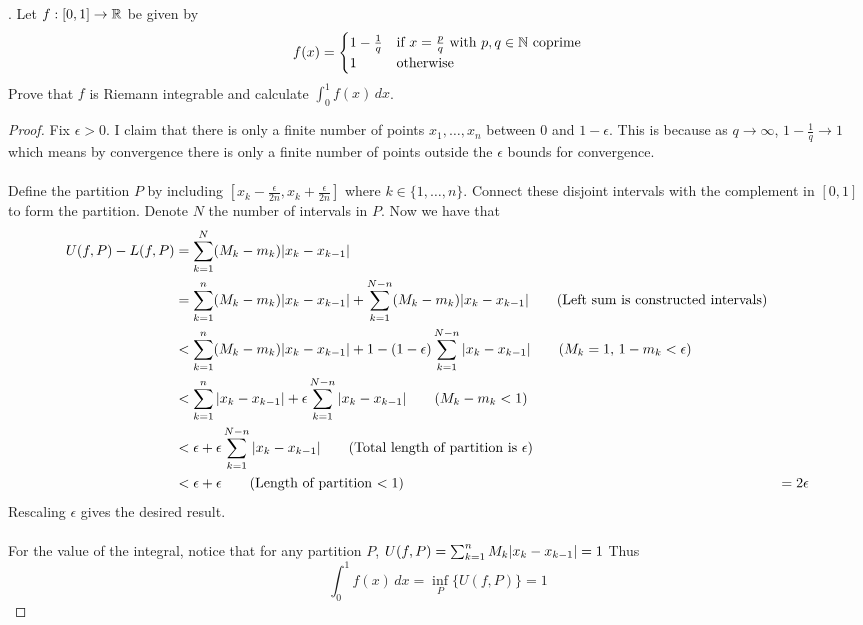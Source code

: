 \documentclass[a4paper]{article}
\begin{document}
\begin{qtn}{}{}
\thetcbcounter.\;\; Let $f:[0,1]\to\mathbb{R}$ be given by $$f(x)=\begin{cases}
1-\frac{1}{q} & \text{if }x=\frac{p}{q} \text{ with } p,q\in\mathbb{N} \text{ coprime}\\
1 & \text{otherwise}
\end{cases}$$ 
Prove that $f$ is Riemann integrable and calculate $\int_0^1f(x)\,dx$. \\\hspace*{\fill}\cite{R0002}\tcbline
\begin{proof}
Fix $\epsilon>0$. I claim that there is only a finite number of points $x_1,\dots,x_n$ between $0$ and $1-\epsilon$. This is because as $q\to\infty$, $1-\frac{1}{q}\to 1$ which means by convergence there is only a finite number of points outside the $\epsilon$ bounds for convergence. \\~\\
Define the partition $P$ by including $[x_k-\frac{\epsilon}{2n},x_k+\frac{\epsilon}{2n}]$ where $k\in\{1,\dots,n\}$. Connect these disjoint intervals with the complement in $[0,1]$ to form the partition. Denote $N$ the number of intervals in $P$. Now we have that 
\begin{align*}
U(f,P)-L(f,P)&=\sum_{k=1}^N(M_k-m_k)\abs{x_k-x_{k-1}}\\
&=\sum_{k=1}^n(M_k-m_k)\abs{x_k-x_{k-1}}+\sum_{k=1}^{N-n}(M_k-m_k)\abs{x_k-x_{k-1}}\tag{Left sum is constructed intervals}\\
&<\sum_{k=1}^n(M_k-m_k)\abs{x_k-x_{k-1}}+1-(1-\epsilon)\sum_{k=1}^{N-n}\abs{x_k-x_{k-1}}\tag{$M_k=1$, $1-m_k<\epsilon$}\\
&<\sum_{k=1}^n\abs{x_k-x_{k-1}}+\epsilon\sum_{k=1}^{N-n}\abs{x_k-x_{k-1}}\tag{$M_k-m_k<1$}\\
&<\epsilon+\epsilon\sum_{k=1}^{N-n}\abs{x_k-x_{k-1}}\tag{Total length of partition is $\epsilon$}\\
&<\epsilon+\epsilon\tag{Length of partition $<1$}
&=2\epsilon
\end{align*}
Rescaling $\epsilon$ gives the desired result. \\~\\
For the value of the integral, notice that for any partition $P$, $U(f,P)=\sum_{k=1}^nM_k\abs{x_k-x_{k-1}}=1$ Thus $$\int_0^1f(x)\,dx=\inf_P\{U(f,P)\}=1$$
\end{proof}
\end{qtn}
\end{document}

